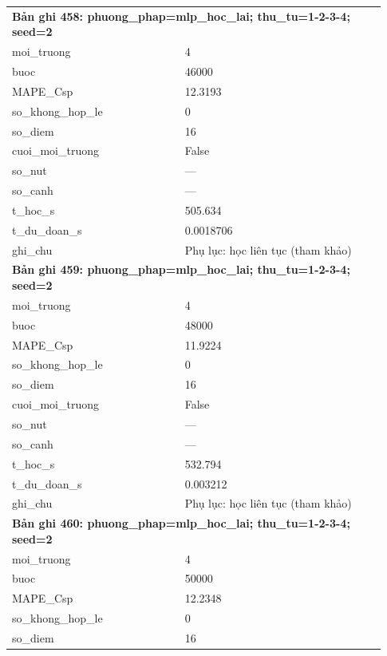 \begin{longtable}{p{0.43\linewidth}p{0.50\linewidth}}
\midrule
\multicolumn{2}{p{0.95\linewidth}}{\textbf{Bản ghi 458: phuong\_phap=mlp\_hoc\_lai; thu\_tu=1-2-3-4; seed=2}} \\
moi\_\allowbreak truong & 4 \\
buoc & 46000 \\
MAPE\_\allowbreak Csp & 12.3193 \\
so\_\allowbreak khong\_\allowbreak hop\_\allowbreak le & 0 \\
so\_\allowbreak diem & 16 \\
cuoi\_\allowbreak moi\_\allowbreak truong & False \\
so\_\allowbreak nut & — \\
so\_\allowbreak canh & — \\
t\_\allowbreak hoc\_\allowbreak s & 505.634 \\
t\_\allowbreak du\_\allowbreak doan\_\allowbreak s & 0.0018706 \\
ghi\_\allowbreak chu & Phụ lục: học liên tục (tham khảo) \\
\midrule
\multicolumn{2}{p{0.95\linewidth}}{\textbf{Bản ghi 459: phuong\_phap=mlp\_hoc\_lai; thu\_tu=1-2-3-4; seed=2}} \\
moi\_\allowbreak truong & 4 \\
buoc & 48000 \\
MAPE\_\allowbreak Csp & 11.9224 \\
so\_\allowbreak khong\_\allowbreak hop\_\allowbreak le & 0 \\
so\_\allowbreak diem & 16 \\
cuoi\_\allowbreak moi\_\allowbreak truong & False \\
so\_\allowbreak nut & — \\
so\_\allowbreak canh & — \\
t\_\allowbreak hoc\_\allowbreak s & 532.794 \\
t\_\allowbreak du\_\allowbreak doan\_\allowbreak s & 0.003212 \\
ghi\_\allowbreak chu & Phụ lục: học liên tục (tham khảo) \\
\midrule
\multicolumn{2}{p{0.95\linewidth}}{\textbf{Bản ghi 460: phuong\_phap=mlp\_hoc\_lai; thu\_tu=1-2-3-4; seed=2}} \\
moi\_\allowbreak truong & 4 \\
buoc & 50000 \\
MAPE\_\allowbreak Csp & 12.2348 \\
so\_\allowbreak khong\_\allowbreak hop\_\allowbreak le & 0 \\
so\_\allowbreak diem & 16 \\

\end{longtable}
